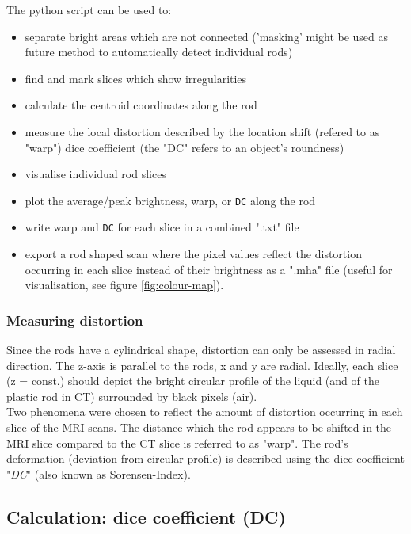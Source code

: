 The python script can be used to:
\begin{itemize}
 \item separate bright areas which are not connected ('masking' might be used as future method to automatically detect individual rods)
 \item find and mark slices which show irregularities
 \item calculate the centroid coordinates along the rod
 \item measure the local distortion described by the
  \subitem location shift (refered to as "warp")
  \subitem dice coefficient (the "DC" refers to an object's roundness)
 \item visualise individual rod slices
 \item plot the average/peak brightness, warp, or \texttt{DC} along the rod
 \item write warp and \texttt{DC}  for each slice in a combined ".txt" file
 \item export a rod shaped scan where the pixel values reflect the distortion occurring in each slice instead of their brightness as a ".mha" file (useful for visualisation, see figure \ref{fig:colour-map}).
\end{itemize}


\subsubsection{Measuring distortion}

Since the rods have a cylindrical shape, distortion can only be assessed in radial direction.
The z-axis is parallel to the rods, x and y are radial.
Ideally, each slice (z = const.) should depict the bright circular profile of the liquid (and of the plastic rod in CT) surrounded by black pixels (air).
\\
Two phenomena were chosen to reflect the amount of distortion occurring in each slice of the MRI scans.
The distance which the rod appears to be shifted in the MRI slice compared to the CT slice is referred to as "warp".
The rod's deformation (deviation from circular profile) is described using the dice-coefficient "\textit{DC}" (also known as Sorensen-Index).


\subsection{Calculation: dice coefficient (DC)}
\label{sec:DC}


